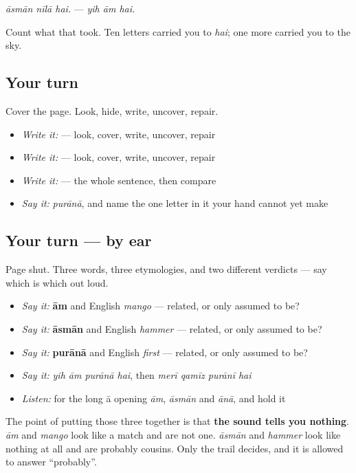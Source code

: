 \begin{quote}
  
\end{quote}

\emph{āsmān nīlā hai.} — \emph{yih ām hai.}

Count what that took. Ten letters carried you to \emph{hai}; one more carried you to the sky.

\subsection*{Your turn}
Cover the page. Look, hide, write, uncover, repair.

\begin{itemize}
\raggedright
  \item \emph{Write it:}  — look, cover, write, uncover, repair
  \item \emph{Write it:}  — look, cover, write, uncover, repair
  \item \emph{Write it:}    — the whole sentence, then compare
  \item \emph{Say it:} \emph{purānā}, and name the one letter in it your hand cannot yet make
\end{itemize}

\subsection*{Your turn — by ear}
Page shut. Three words, three etymologies, and two different verdicts — say which is which out loud.

\begin{itemize}
\raggedright
  \item \emph{Say it:} \textbf{ām} and English \emph{mango} — related, or only assumed to be?
  \item \emph{Say it:} \textbf{āsmān} and English \emph{hammer} — related, or only assumed to be?
  \item \emph{Say it:} \textbf{purānā} and English \emph{first} — related, or only assumed to be?
  \item \emph{Say it:} \emph{yih ām purānā hai}, then \emph{merī qamīz purānī hai}
  \item \emph{Listen:} for the long ā opening \emph{ām}, \emph{āsmān} and \emph{ānā}, and hold it
\end{itemize}

The point of putting those three together is that \textbf{the sound tells you nothing}. \emph{ām} and \emph{mango} look like a match and are not one. \emph{āsmān} and \emph{hammer} look like nothing at all and are probably cousins. Only the trail decides, and it is allowed to answer \textquotedblleft{}probably\textquotedblright{}.

